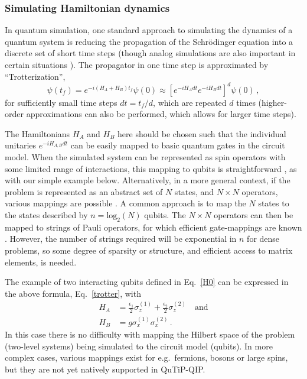 \documentclass[preprint,3p,sort&compress]{elsarticle}
\begin{document}
\subsubsection{Simulating Hamiltonian dynamics}

In quantum simulation, one standard approach to simulating the dynamics of a quantum system is reducing the propagation of the Schrödinger equation into a discrete set of short time steps \cite{Buluta2009, Georgescu2014} (though analog simulations are also important in certain situations \cite{RevModPhys.84.1}). The propagator in one time step is approximated by ``Trotterization'',
\begin{equation} \label{trotter}
\psi(t_f) = e^{-i(H_A+H_B)t_f}\psi(0) \approx \left[e^{-iH_A dt }e^{-iH_B dt }\right]^d \psi(0) \, ,
\end{equation}
for sufficiently small time steps $dt = t_f/d$, which are repeated $d$ times (higher-order approximations can also be performed, which allows for larger time steps).

The Hamiltonians $H_A$ and $H_B$ here should be chosen such that the individual unitaries $e^{-iH_{A,B} dt}$ can be easily mapped to basic quantum gates in the circuit model.  When the simulated system can be represented as spin operators with some limited range of interactions, this mapping to qubits is straightforward \cite{nielsen2002quantum, lloyd96}, as with our simple example below. Alternatively, in a more general context, if the problem is represented as an abstract set of $N$ states, and $N\times N$ operators, various mappings are possible \cite{10.1145/780542.780546,10.5555/2481569.2481570,7354428, Low_2019}. A common approach is to map the $N$ states to the states described by  $n= \mathrm{log}_2(N)$ qubits. The $N\times N$ operators can then be mapped to strings of Pauli operators, for which efficient gate-mappings are known \cite{nielsen2002quantum}.  However, the number of strings required will be exponential in $n$ for dense problems, so some degree of sparsity or structure, and efficient access to matrix elements, is needed.


The example of two interacting qubits defined in Eq.~\eqref{H0} can be expressed in the above formula, Eq.~\eqref{trotter}, with
\begin{align}
 H_A &= \frac{\epsilon_1}{2} \sigma_z^{(1)}+ \frac{\epsilon_2}{2} \sigma_z^{(2)} \quad\text{and} \label{HA} \\
 H_B &= g \sigma_x^{(1)} \sigma_x^{(2)} \, . \label{HB}
\end{align}
In this case there is no difficulty with mapping the Hilbert space of the problem (two-level systems) being simulated to the circuit model (qubits). In more complex cases, various mappings exist for e.g.\ fermions, bosons or large spins, but they are not yet natively supported in QuTiP-QIP.
\end{document}
